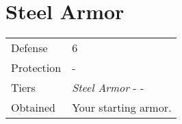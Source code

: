 \section{Steel Armor}
\label{armor:steel_armor}


\noindent\begin{tabularx}{\textwidth}[l]{lX}
	Defense
	& 6
\\ %
	Protection
	& -
\\ %
	Tiers
	& \textit{Steel Armor} - \nameref{armor:noble_armor} - \nameref{armor:gaias_armor}
\\ %
	Obtained
	& Your starting armor.
\end{tabularx}
